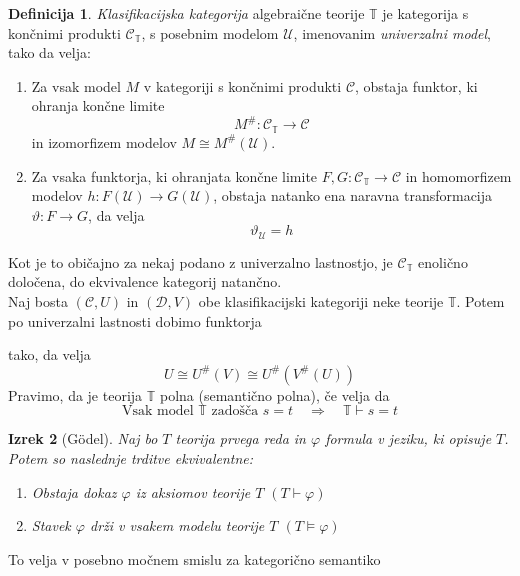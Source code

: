 \documentclass[12pt,a4paper]{book}
\theoremstyle{definition}
\newtheorem{definicija}{Definicija}[chapter]
\theoremstyle{plain}
\newtheorem{izrek}[definicija]{Izrek}
\theoremstyle{definition}
\theoremstyle{remark}
\begin{document}
\begin{definicija}
\emph{Klasifikacijska kategorija} algebraične teorije $\mathbb{T}$ je kategorija s končnimi produkti $\mathcal{C}_\mathbb{T}$, s posebnim modelom $\mathcal{U}$, imenovanim \emph{univerzalni model}, tako da velja:
\begin{enumerate}
\item Za vsak model $M$ v kategoriji s končnimi produkti $\mathcal{C}$, obstaja funktor, ki ohranja končne limite $$M^{\#} : \mathcal{C}_\mathbb{T} \to \mathcal{C}$$
in izomorfizem modelov $M \cong M^{\#}(\mathcal{U})$.
%
\item Za vsaka funktorja, ki ohranjata končne limite $F,G : \mathcal{C}_\mathbb{T} \to \mathcal{C}$ in homomorfizem modelov $h: F(\mathcal{U}) \to G(\mathcal{U})$, obstaja natanko ena naravna transformacija $\vartheta : F \to G$, da velja
$$\vartheta_\mathcal{U} = h$$
\end{enumerate}
\end{definicija}
Kot je to običajno za nekaj podano z univerzalno lastnostjo, je $\mathcal{C}_\mathbb{T}$ enolično določena, do ekvivalence kategorij natančno. \\
\vspace{1cm}
%
Naj bosta $(\mathcal{C}, U)$ in $(\mathcal{D}, V)$ obe klasifikacijski kategoriji neke teorije $\mathbb{T}$. Potem po univerzalni lastnosti dobimo funktorja
\begin{center}
\end{center}
tako, da velja
$$U \cong U^{\#}(V) \cong U^{\#}(V^{\#}(U))$$
Pravimo, da je teorija $\mathbb{T}$ polna (semantično polna), če velja da
$$\text{Vsak model } \mathbb{T} \text{ zadošča }s=t \quad \Longrightarrow \quad \mathbb{T} \vdash s = t$$
\begin{izrek}[Gödel]
Naj bo $T$ teorija prvega reda in $\varphi$ formula v jeziku, ki opisuje $T$. Potem so naslednje trditve ekvivalentne:
\begin{enumerate}
\item Obstaja dokaz $\varphi$ iz aksiomov teorije $T$ $(T \vdash \varphi)$
\item Stavek $\varphi$ drži v vsakem modelu teorije $T$ $(T \models \varphi)$
\end{enumerate}
\end{izrek}
To velja v posebno močnem smislu za kategorično semantiko
\end{document}
